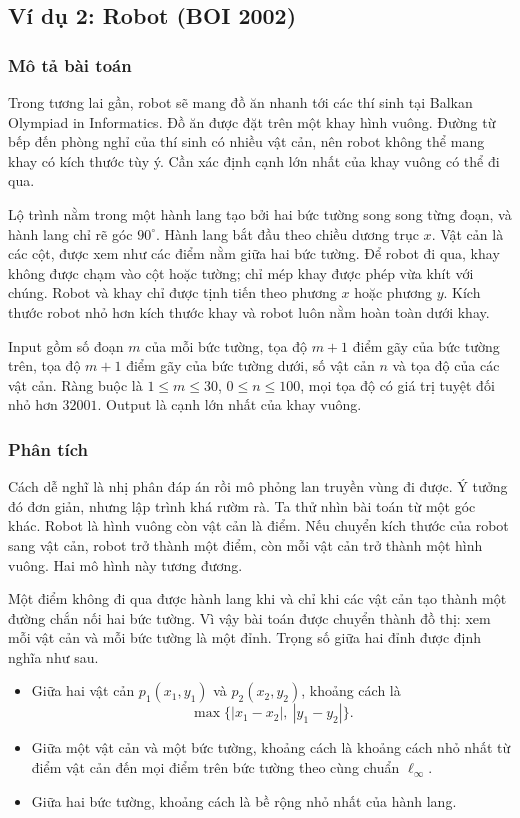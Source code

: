 \documentclass[11pt]{article}
\begin{document}
\subsection{Ví dụ 2: Robot (BOI 2002)}

\subsubsection*{Mô tả bài toán}

Trong tương lai gần, robot sẽ mang đồ ăn nhanh tới các thí sinh tại Balkan
Olympiad in Informatics. Đồ ăn được đặt trên một khay hình vuông. Đường từ
bếp đến phòng nghỉ của thí sinh có nhiều vật cản, nên robot không thể mang
khay có kích thước tùy ý. Cần xác định cạnh lớn nhất của khay vuông có thể đi
qua.

Lộ trình nằm trong một hành lang tạo bởi hai bức tường song song từng đoạn,
và hành lang chỉ rẽ góc $90^\circ$. Hành lang bắt đầu theo chiều dương trục
$x$. Vật cản là các cột, được xem như các điểm nằm giữa hai bức tường. Để
robot đi qua, khay không được chạm vào cột hoặc tường; chỉ mép khay được phép
vừa khít với chúng. Robot và khay chỉ được tịnh tiến theo phương $x$ hoặc
phương $y$. Kích thước robot nhỏ hơn kích thước khay và robot luôn nằm hoàn
toàn dưới khay.

Input gồm số đoạn $m$ của mỗi bức tường, tọa độ $m+1$ điểm gãy của bức tường
trên, tọa độ $m+1$ điểm gãy của bức tường dưới, số vật cản $n$ và tọa độ của
các vật cản. Ràng buộc là $1\le m\le 30$, $0\le n\le 100$, mọi tọa độ có giá
trị tuyệt đối nhỏ hơn $32001$. Output là cạnh lớn nhất của khay vuông.

\subsubsection*{Phân tích}

Cách dễ nghĩ là nhị phân đáp án rồi mô phỏng lan truyền vùng đi được. Ý tưởng
đó đơn giản, nhưng lập trình khá rườm rà. Ta thử nhìn bài toán từ một góc
khác. Robot là hình vuông còn vật cản là điểm. Nếu chuyển kích thước của robot
sang vật cản, robot trở thành một điểm, còn mỗi vật cản trở thành một hình
vuông. Hai mô hình này tương đương.

Một điểm không đi qua được hành lang khi và chỉ khi các vật cản tạo thành một
đường chắn nối hai bức tường. Vì vậy bài toán được chuyển thành đồ thị: xem
mỗi vật cản và mỗi bức tường là một đỉnh. Trọng số giữa hai đỉnh được định
nghĩa như sau.

\begin{itemize}
  \item Giữa hai vật cản $p_1(x_1,y_1)$ và $p_2(x_2,y_2)$, khoảng cách là
  \[
    \max\{|x_1-x_2|,\ |y_1-y_2|\}.
  \]
  \item Giữa một vật cản và một bức tường, khoảng cách là khoảng cách nhỏ
  nhất từ điểm vật cản đến mọi điểm trên bức tường theo cùng chuẩn
  $\ell_\infty$.
  \item Giữa hai bức tường, khoảng cách là bề rộng nhỏ nhất của hành lang.
\end{itemize}
\end{document}
